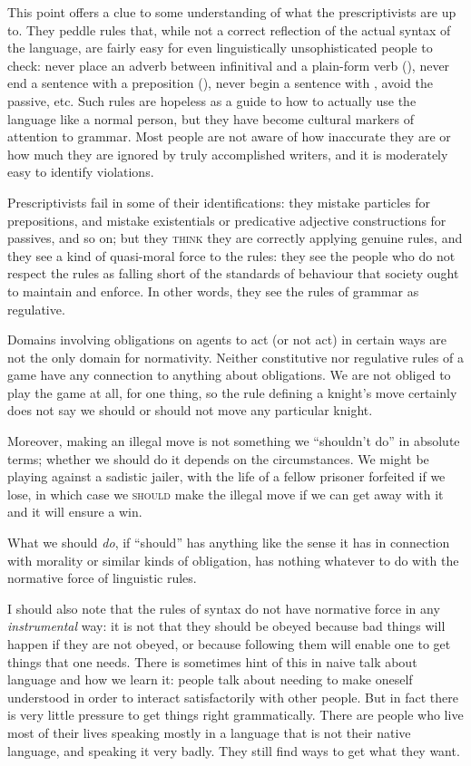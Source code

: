 \documentclass[output=paper]{langscibook}
\begin{document}
This point offers a clue to some understanding of what the prescriptivists are up to.  They peddle rules that, while not a correct reflection of the actual syntax of the language, are fairly easy for even linguistically unsophisticated people to check: never place an adverb between infinitival  and a plain-form verb (), never end a sentence with a preposition (), never begin a sentence with , avoid the passive, etc. Such rules are hopeless as a guide to how to actually use the language like a normal person, but they have become cultural markers of attention to grammar. Most people are not aware of how inaccurate they are or how much they are ignored by truly accomplished writers, and it is moderately easy to identify violations.

Prescriptivists fail in some of their identifications: they mistake particles for prepositions, and mistake existentials or predicative adjective constructions for passives, and so on; but they \textsc{think} they are correctly applying genuine rules, and they see a kind of quasi-moral force to the rules: they see the people who do not respect the rules as falling short of the standards of behaviour that society ought to maintain and enforce.  In other words, they see the rules of grammar as regulative.

Domains involving obligations on agents to act (or not act) in certain ways are not the only domain for normativity.  Neither constitutive nor regulative rules of a game have any connection to anything about obligations.  We are not obliged to play the game at all, for one thing, so the rule defining a knight's move certainly does not say we should or should not move any particular knight.

Moreover, making an illegal move is not something we ``shouldn't do'' in absolute terms; whether we should do it depends on the circumstances. We might be playing against a sadistic jailer, with the life of a fellow prisoner forfeited if we lose, in which case we \textsc{should} make the illegal move if we can get away with it and it will ensure a win.

What we should \emph{do}, if ``should'' has anything like the sense it has in connection with morality or similar kinds of obligation, has nothing whatever to do with the normative force of linguistic rules.

I should also note that the rules of syntax do not have normative force in any \emph{instrumental} way: it is not that they should be obeyed because bad things will happen if they are not obeyed, or because following them will enable one to get things that one needs. There is sometimes hint of this in naive talk about language and how we learn it: people talk about needing to make oneself understood in order to interact satisfactorily with other people. But in fact there is very little pressure to get things right grammatically.  There are people who live most of their lives speaking mostly in a language that is not their native language, and speaking it very badly. They still find ways to get what they want.
\end{document}

